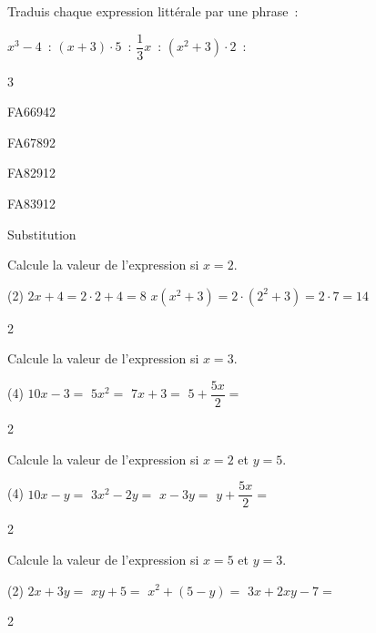 \documentclass[a4paper,11pt]{report}
\begin{document}
\begin{exop}{ Traduis chaque expression littérale par une phrase~:
\begin{tasks}
    \task $x^3-4$~: \hrulefill
    \task $(x+3)\cdot5$~: \hrulefill
     \task  $\dfrac{1}{3}x$~: \hrulefill
     \task  $(x^2+3)\cdot2$~: \hrulefill
\end{tasks}
}
{3}
\end{exop}

\begin{exof}{FA66}{94}{2}
\end{exof}

\begin{exol}{FA67}{89}{2}
\end{exol}

\begin{exol}{FA82}{91}{2}
\end{exol}

\begin{exol}{FA83}{91}{2}
\end{exol}

\begin{resolu}{Substitution}
{Calcule la valeur de l'expression si $x=2$.
	\vspace{-0.3cm}
\begin{tasks}(2)
    \task $2x+4 = 2\cdot 2 + 4= 8$
    \task $x(x^2 + 3)= 2\cdot (2^2 + 3)=2 \cdot 7 =14$
\end{tasks}
}
{2}
\end{resolu}

\begin{exo}
{Calcule la valeur de l'expression si $x=3$.
	\vspace{-0.3cm}
\begin{tasks}(4)
    \task $10x-3=$
     \task $5x^2=$
     \task $7x+3=$
     \task $5+\dfrac{5x}{2}=$
\end{tasks}
}
{2}
\end{exo}

\begin{exo}
{Calcule la valeur de l'expression si $x=2$ et $y=5$.
\begin{tasks}(4)
    \task $10x-y=$
     \task $3x^2-2y=$
     \task $x-3y=$
     \task $y+\dfrac{5x}{2}=$
\end{tasks}
\vspace{-0.3cm}
}
{2}
\end{exo}


\begin{exo}
{Calcule la valeur de l'expression si $x=5$ et $y=3$.
\begin{tasks}(2)
    \task $2x+3y=$
     \task $xy+5=$
     \task $x^2+(5-y)=$
     \task $3x+2xy-7=$
\end{tasks}
}
{2}
\end{exo}
\end{document}

